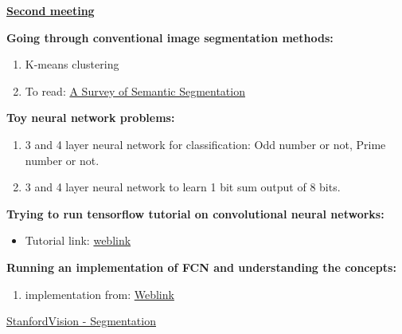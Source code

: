 \documentclass[14pt]{extarticle}
\begin{document}
\begin{center}
\begin{Large}

\underline{\textbf{Second meeting}}

\end{Large}
\end{center}

\textbf{Going through conventional image segmentation methods:}

\begin{enumerate}

\item K-means clustering

\item To read: \href{https://arxiv.org/pdf/1602.06541.pdf}{A Survey of Semantic Segmentation}

\end{enumerate}

\textbf{Toy neural network problems:}

\begin{enumerate}

\item 3 and 4 layer neural network for classification: Odd number or not, Prime number or not.
\item 3 and 4 layer neural network to learn 1 bit sum output of 8 bits.

\end{enumerate}

\textbf{Trying to run tensorflow tutorial on convolutional neural networks:}
\begin{itemize}

\item Tutorial link: \href{https://www.tensorflow.org/tutorials/layers}{weblink}

\end{itemize}

\textbf{Running an implementation of FCN and understanding the concepts:}
\begin{enumerate}

\item implementation from: \href{https://github.com/MarvinTeichmann/tensorflow-fcn}{Weblink}

\end{enumerate}

\begin{thebibliography}{9}

\href{http://vision.stanford.edu/teaching/cs231b_spring1213/slides/segmentation.pdf}{StanfordVision - Segmentation}


 


\end{thebibliography}
\end{document}
